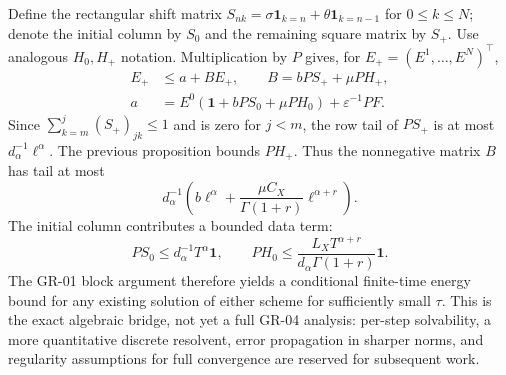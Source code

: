 \documentclass[11pt,a4paper]{article}
\begin{document}
Define the rectangular shift matrix $S_{nk}=\sigma\mathbf1_{k=n}+\theta\mathbf1_{k=n-1}$ for $0\le k\le N$; denote the initial column by $S_0$ and the remaining square matrix by $S_+$. Use analogous $H_0,H_+$ notation. Multiplication by $P$ gives, for $E_+=(E^1,\ldots,E^N)^\top$,
\begin{align*}
 E_+&\le a+B E_+,\qquad B=bPS_++\mu PH_+,\\
 a&=E^0(\mathbf1+bPS_0+\mu PH_0)+\varepsilon^{-1}PF.
\end{align*}
Since $\sum_{k=m}^j(S_+)_{jk}\le1$ and is zero for $j<m$, the row tail of $PS_+$ is at most $d_\alpha^{-1}\ell^\alpha$. The previous proposition bounds $PH_+$. Thus the nonnegative matrix $B$ has tail at most
\[
 d_\alpha^{-1}\left(b\ell^\alpha+\frac{\mu C_X}{\Gamma(1+r)}\ell^{\alpha+r}\right).
\]
The initial column contributes a bounded data term:\[PS_0\le d_\alpha^{-1}T^\alpha\mathbf1,\qquad PH_0\le \frac{L_X T^{\alpha+r}}{d_\alpha\Gamma(1+r)}\mathbf1.\] The GR-01 block argument therefore yields a conditional finite-time energy bound for any existing solution of either scheme for sufficiently small $\tau$. This is the exact algebraic bridge, not yet a full GR-04 analysis: per-step solvability, a more quantitative discrete resolvent, error propagation in sharper norms, and regularity assumptions for full convergence are reserved for subsequent work.
\end{document}
